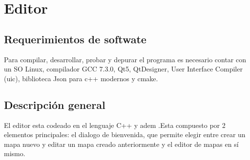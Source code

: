 \documentclass[titlepage,a4paper,12pt]{article}
\begin{document}
\newpage
\section{Editor}

\subsection{Requerimientos de softwate}
Para compilar, desarrollar, probar y depurar el programa es necesario contar con un SO Linux, compilador GCC 7.3.0, Qt5, QtDesigner, User Interface Compiler (uic), biblioteca Json para c++ modernos y cmake.\\

\subsection{Descripción general}

El editor esta codeado en el lenguaje C++ y adem .Esta compuesto por 2 elementos principales: el dialogo de bienvenida, que permite elegir entre crear un mapa nuevo y editar un mapa creado anteriormente y el editor de mapas en sí mismo.   
\end{document}
